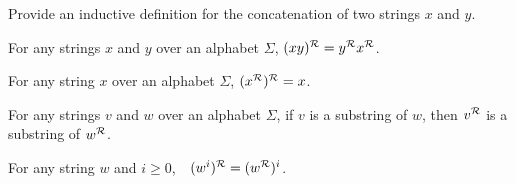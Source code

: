 \begin{exer1}
Provide an inductive definition for the concatenation of two strings $x$ and $y$.
\end{exer1}

\begin{stmt2}
For any strings $x$ and $y$ over an alphabet $\Sigma$, $(xy)^{\mathcal{R}} = y^{\mathcal{R}}x^{\mathcal{R}}$.
\end{stmt2}

\begin{stmt2}
For any string $x$ over an alphabet $\Sigma$, $(x^{\mathcal{R}})^{\mathcal{R}} = x$.
\end{stmt2}

\begin{stmt2}
For any strings $v$ and $w$ over an alphabet $\Sigma$, if $v$ is a substring of $w$, then $v^{\mathcal{R}}$ is a substring of $w^{\mathcal{R}}$.
\end{stmt2}

\begin{stmt2}
For any string $w$ and $i \geq 0$,\ \ $(w^i)^{\mathcal{R}} = (w^{\mathcal{R}})^i$.
\end{stmt2}
